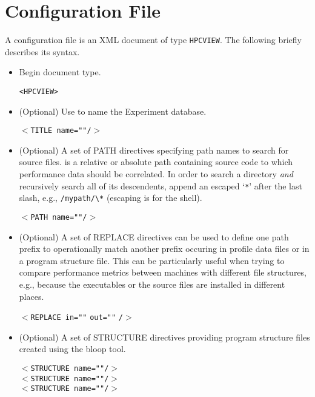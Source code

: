 \documentclass[english]{article}
\begin{document}
\section{Configuration File}

A  configuration file is an XML document of type \texttt{HPCVIEW}.
The following briefly describes its syntax.

\begin{itemize}

\item Begin document type.
  \begin{itemize}
  \verb+<HPCVIEW>+
  \end{itemize}

\item (Optional) Use  to name the Experiment database.
  \begin{itemize}
  \texttt{$<$TITLE name="}\texttt{"/$>$}
  \end{itemize}

\item (Optional) A set of PATH directives specifying path names to search for source files.
 is a relative or absolute path containing source code to which performance data should be correlated.
In order to search a directory \emph{and} recursively search all of its descendents, append an escaped `\texttt{*}' after the last slash, e.g., \verb+/mypath/\*+ (escaping is for the shell).
  \begin{itemize}
  \texttt{$<$PATH name="}\texttt{"/$>$}
  \end{itemize}

\item (Optional) A set of REPLACE directives can be used to define one path prefix to operationally match another prefix occuring in profile data files or in a program structure file. This can be particularly useful when trying to compare performance metrics between machines with different file structures, e.g., because the executables or the source files are installed in different places.
  \begin{itemize}
  \texttt{$<$REPLACE in="}\texttt{"}
    \texttt{out="}\texttt{"}
      \texttt{/$>$}
  \end{itemize}

\item (Optional) A set of STRUCTURE directives providing program structure files created using the bloop tool.
  \begin{itemize}
  \texttt{$<$STRUCTURE name="}\texttt{"/$>$}\\
  \texttt{$<$STRUCTURE name="}\texttt{"/$>$}\\
  \texttt{$<$STRUCTURE name="}\texttt{"/$>$}\\
  \end{itemize}


\end{itemize}
\end{document}
